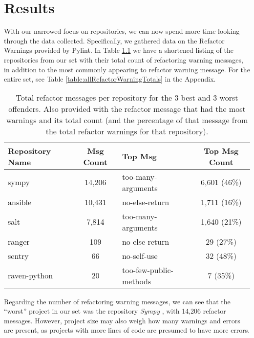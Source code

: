 \chapter{Results} \label{chapterResults}


With our narrowed focus on repositories, we can now spend more time looking through the data collected. Specifically, we gathered data on the Refactor Warnings provided by Pylint. In Table \ref{table:smallRefactorWarningTotals} we have a shortened listing of the repositories from our set with their total count of refactoring warning messages, in addition to the most commonly appearing to refactor warning message. For the entire set, see Table \ref{table:allRefactorWarningTotals} in the Appendix.

\begin{table}[ht]
  \small
  \centering
  \begin{tabularx}{1.0\textwidth} {
    | l 
    | c
    | >{\centering\arraybackslash}X 
    | c |
  }
    \hline
    Repository Name & Msg Count & Top Msg & Top Msg Count \\
    \hline\hline
    sympy & 14,206 & too-many-arguments & 6,601 (46\%) \\ \hline
    ansible &  10,431 & no-else-return & 1,711 (16\%) \\ \hline
    salt &  7,814 & too-many-arguments & 1,640 (21\%) \\ \hline \hline
    ranger & 109 & no-else-return & 29 (27\%) \\ \hline
    sentry & 66 & no-self-use & 32 (48\%) \\ \hline
    raven-python & 20 & too-few-public-methods & 7 (35\%) \\ \hline
  \end{tabularx}
  \caption{Total refactor messages per repository for the 3 best and 3 worst offenders. Also provided with the refactor message that had the most warnings and its total count (and the percentage of that message from the total refactor warnings for that repository).}
  \label{table:smallRefactorWarningTotals}
\end{table}

Regarding the number of refactoring warning messages, we can see that the ``worst'' project in our set was the repository \emph{Sympy} \cite{data:sympy}, with 14,206 refactor messages. However, project size may also weigh how many warnings and errors are present, as projects with more lines of code are presumed to have more errors.

